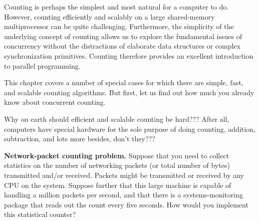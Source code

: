 

Counting is perhaps the simplest and most natural for a computer to do.
However, counting efficiently and scalably on a large
shared-memory multiprocessor can be quite challenging.
Furthermore, the simplicity of the underlying concept of counting
allows us to explore the fundamental issues of concurrency without
the distractions
of elaborate data structures or complex synchronization primitives.
Counting therefore provides an excellent introduction to
parallel programming.

This chapter covers a number of special cases for which there are simple,
fast, and scalable counting algorithms.
But first, let us find out how much you already know about concurrent
counting.

\QuickQuiz{}
	Why on earth should efficient and scalable counting be hard???
	After all, computers have special hardware for the sole purpose
	of doing counting,
	addition, subtraction, and lots more besides, don't they???
 \QuickQuizEnd

\QuickQuiz{}
	{ \bfseries Network-packet counting problem. }
	Suppose that you need to collect statistics on the number
	of networking packets (or total number of bytes) transmitted
	and/or received.
	Packets might be transmitted or received by any CPU on
	the system.
	Suppose further that this large machine is capable of
	handling a million packets per second, and that there
	is a systems-monitoring package that reads out the count
	every five seconds.
	How would you implement this statistical counter?
 \QuickQuizEnd

